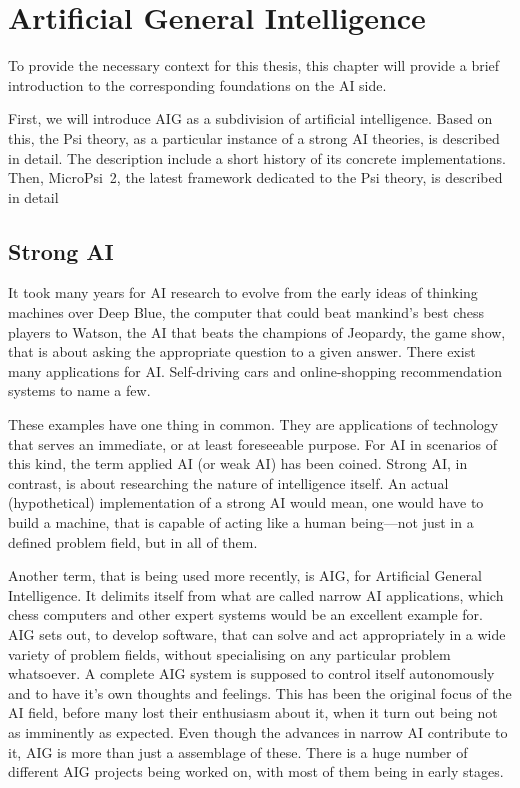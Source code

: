 \chapter{Artificial General Intelligence}
To provide the necessary context for this thesis, this chapter will provide a brief introduction to the corresponding foundations on the AI side.

First, we will introduce AIG as a subdivision of artificial intelligence. Based on this, the Psi theory, as a particular instance of a strong AI theories, is described in detail. The description include a short history of its concrete implementations. Then, MicroPsi~2, the latest framework dedicated to the Psi theory, is described in detail 

    \section{Strong AI}
It took many years for AI research to evolve from the early ideas of thinking machines over Deep Blue, the computer that could beat mankind's best chess players to Watson, the AI that beats the champions of Jeopardy, the game show, that is about asking the appropriate question to a given answer. There exist many applications for AI. Self-driving cars and online-shopping recommendation systems to name a few.


These examples have one thing in common. They are applications of technology that serves an immediate, or at least foreseeable purpose. For AI in scenarios of this kind, the term applied AI (or weak AI) has been coined. Strong AI, in contrast, is about researching the nature of intelligence itself. An actual (hypothetical) implementation of a strong AI would mean, one would have to build a machine, that is capable of acting like a human being---not just in a defined problem field, but in all of them. 

Another term, that is being used more recently, is AIG, for Artificial General Intelligence. It delimits itself from what are called narrow AI applications, which chess computers and other expert systems would be an excellent example for. AIG sets out, to develop software, that can solve and act appropriately in a wide variety of problem fields, without specialising on any particular problem whatsoever. A complete AIG system is supposed to control itself autonomously and to have it's own thoughts and feelings. This has been the original focus of the AI field, before many lost their enthusiasm about it, when it turn out being not as imminently as expected. Even though the advances in narrow AI contribute to it, AIG is more than just a assemblage of these. There is a huge number of different AIG projects being worked on, with most of them being in early stages.~\cite{goertzel2007artificial}

